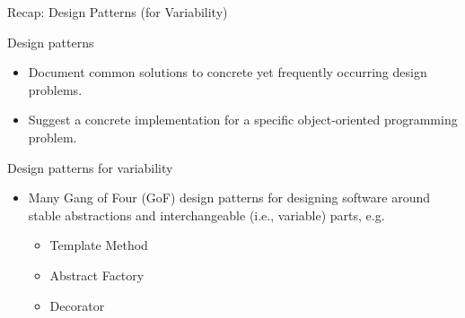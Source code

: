 \begin{frame}{Recap: Design Patterns (for Variability) \mytitlesource{\gof}}
	\begin{mycolumns}[forget]
		\vspace{-10mm}
		\begin{note}{Design patterns }
			\begin{itemize}
				\item Document common solutions to concrete yet frequently occurring design problems.
				\item Suggest a concrete implementation for a specific object-oriented programming problem.
			\end{itemize}
		\end{note}
		\begin{note}{Design patterns for variability}
			\begin{itemize}
				\item Many Gang of Four (GoF) design patterns for designing software around stable abstractions and interchangeable (i.e., variable) parts, e.g.
				\begin{itemize}
					\item Template Method
					\item Abstract Factory
					\item Decorator
				\end{itemize}
			\end{itemize}
		\end{note}	
	\mynextcolumn
	\end{mycolumns}
\end{frame}

